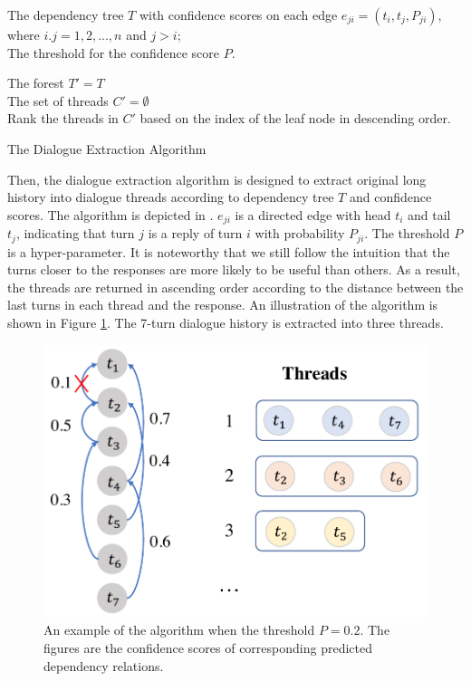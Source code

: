 \begin{algorithm}
	\scriptsize
	\SetAlgoNoLine 
	
	\Input
	{
		The dependency tree $T$ with confidence scores on each edge $e_{ji}=(t_i, t_j, P_{ji})$, where $i.j=1, 2, ..., n$ and $j>i$;\\
		The threshold for the confidence score $P$.
	}
	\BlankLine
	
	The forest $T' = T$\\
	The set of threads $C'=\emptyset$\\
	Rank the threads in $C'$ based on the index of the leaf node in descending order.
	
	\caption{The Dialogue Extraction Algorithm\label{alg:A}}
	\label{alg:DSA}
\end{algorithm}


Then, the dialogue extraction algorithm is designed to extract original long history into dialogue threads according to dependency tree $T$ and confidence scores. The algorithm is 
depicted in . $e_{ji}$ is a directed edge with head $t_i$ and tail $t_j$, 
indicating that turn $j$ is a reply of turn $i$ with probability $P_{ji}$.
The threshold $P$ is a hyper-parameter. It is noteworthy that we still follow the intuition 
that the turns closer to the responses are more likely to be useful than others. 
As a result, the threads are returned in ascending order according to the distance between 
the last turns in each thread and the response. 
An illustration of the algorithm is shown in Figure \ref{fig:algorithm}. The 7-turn dialogue history is extracted into three threads.
\begin{figure}
	\centering
	\includegraphics[scale=0.40]{pic/algorithm.pdf}
	\caption{An example of the algorithm when the threshold $P=0.2$. The figures are the confidence scores of corresponding predicted dependency relations.}
	\label{fig:algorithm}
\end{figure}

